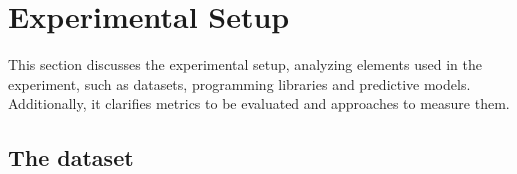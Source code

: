 
%


\section{Experimental Setup}

This section discusses the experimental setup, analyzing elements used in the experiment, such as datasets, programming libraries and predictive models. Additionally, it clarifies metrics to be evaluated and approaches to measure them.  

\subsection{The dataset}

